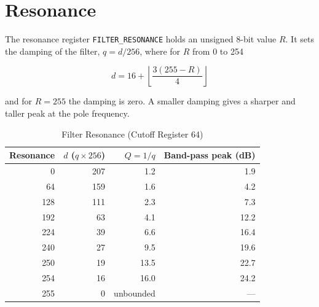 \section{Resonance}
\label{sec:filter-resonance}

The resonance register \texttt{FILTER\_RESONANCE} holds an unsigned 8-bit value $R$. It sets the damping of the filter,
$q = d / 256$, where for $R$ from 0 to 254

\begin{equation*}
	d = 16 + \left\lfloor \frac{3 (255 - R)}{4} \right\rfloor
\end{equation*}

\noindent and for $R = 255$ the damping is zero. A smaller damping gives a sharper and taller peak at the pole frequency.

\begin{table}[H]
	\centering
	\begin{tabular}{rrrr}
		\toprule
		\textbf{Resonance} & \textbf{$d$ ($q \times 256$)} & \textbf{$Q = 1/q$} & \textbf{Band-pass peak (dB)} \\
		\midrule
		0                  & 207                           & 1.2                & 1.9                          \\
		64                 & 159                           & 1.6                & 4.2                          \\
		128                & 111                           & 2.3                & 7.3                          \\
		192                & 63                            & 4.1                & 12.2                         \\
		224                & 39                            & 6.6                & 16.4                         \\
		240                & 27                            & 9.5                & 19.6                         \\
		250                & 19                            & 13.5               & 22.7                         \\
		254                & 16                            & 16.0               & 24.2                         \\
		255                & 0                             & unbounded          & ---                          \\
		\bottomrule
	\end{tabular}
	\caption{Filter Resonance (Cutoff Register 64)}
	\label{tab:filter-resonance}
\end{table}

